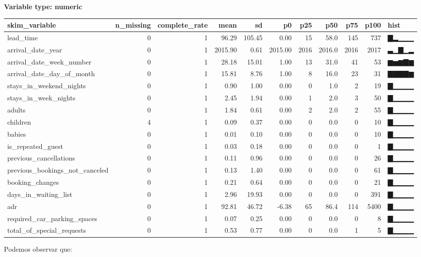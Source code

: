 \documentclass[
]{article}
\begin{document}
\textbf{Variable type: numeric}

\begin{longtable}[]{@{}lrrrrrrrrrl@{}}
\toprule
skim\_variable & n\_missing & complete\_rate & mean & sd & p0 & p25 &
p50 & p75 & p100 & hist \\
\midrule
\endhead
lead\_time & 0 & 1 & 96.29 & 105.45 & 0.00 & 15 & 58.0 & 145 & 737 &
▇▂▁▁▁ \\
arrival\_date\_year & 0 & 1 & 2015.90 & 0.61 & 2015.00 & 2016 & 2016.0 &
2016 & 2017 & ▃▁▇▁▂ \\
arrival\_date\_week\_number & 0 & 1 & 28.18 & 15.01 & 1.00 & 13 & 31.0 &
41 & 53 & ▆▅▆▇▆ \\
arrival\_date\_day\_of\_month & 0 & 1 & 15.81 & 8.76 & 1.00 & 8 & 16.0 &
23 & 31 & ▇▇▇▇▆ \\
stays\_in\_weekend\_nights & 0 & 1 & 0.90 & 1.00 & 0.00 & 0 & 1.0 & 2 &
19 & ▇▁▁▁▁ \\
stays\_in\_week\_nights & 0 & 1 & 2.45 & 1.94 & 0.00 & 1 & 2.0 & 3 & 50
& ▇▁▁▁▁ \\
adults & 0 & 1 & 1.84 & 0.61 & 0.00 & 2 & 2.0 & 2 & 55 & ▇▁▁▁▁ \\
children & 4 & 1 & 0.09 & 0.37 & 0.00 & 0 & 0.0 & 0 & 10 & ▇▁▁▁▁ \\
babies & 0 & 1 & 0.01 & 0.10 & 0.00 & 0 & 0.0 & 0 & 10 & ▇▁▁▁▁ \\
is\_repeated\_guest & 0 & 1 & 0.03 & 0.18 & 0.00 & 0 & 0.0 & 0 & 1 &
▇▁▁▁▁ \\
previous\_cancellations & 0 & 1 & 0.11 & 0.96 & 0.00 & 0 & 0.0 & 0 & 26
& ▇▁▁▁▁ \\
previous\_bookings\_not\_canceled & 0 & 1 & 0.13 & 1.40 & 0.00 & 0 & 0.0
& 0 & 61 & ▇▁▁▁▁ \\
booking\_changes & 0 & 1 & 0.21 & 0.64 & 0.00 & 0 & 0.0 & 0 & 21 &
▇▁▁▁▁ \\
days\_in\_waiting\_list & 0 & 1 & 2.96 & 19.93 & 0.00 & 0 & 0.0 & 0 &
391 & ▇▁▁▁▁ \\
adr & 0 & 1 & 92.81 & 46.72 & -6.38 & 65 & 86.4 & 114 & 5400 & ▇▁▁▁▁ \\
required\_car\_parking\_spaces & 0 & 1 & 0.07 & 0.25 & 0.00 & 0 & 0.0 &
0 & 8 & ▇▁▁▁▁ \\
total\_of\_special\_requests & 0 & 1 & 0.53 & 0.77 & 0.00 & 0 & 0.0 & 1
& 5 & ▇▁▁▁▁ \\
\bottomrule
\end{longtable}

Podemos observar que:
\end{document}
